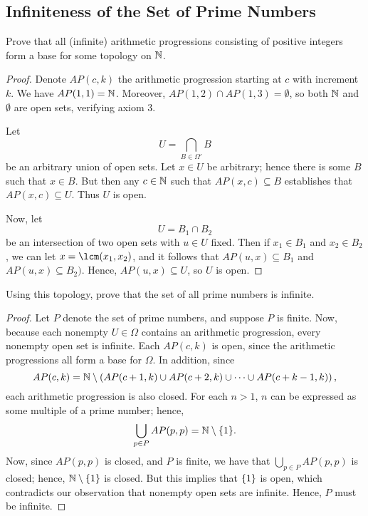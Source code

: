 \subsection{Infiniteness of the Set of Prime Numbers}

\begin{minorEx}
    Prove that all (infinite) arithmetic progressions consisting of positive
    integers form a base for some topology on $\mathbb{N}$.
\end{minorEx}

\begin{proof}
    Denote $AP(c,k)$ the arithmetic progression starting at $c$ with increment
    $k$. We have $AP(1,1) = \mathbb{N}$. Moreover, $AP(1,2) \cap AP(1,3) = \emptyset$,
    so both $\mathbb{N}$ and $\emptyset$ are open sets, verifying axiom 3.

    Let 
    \[
        U = \bigcap_{B \in \Omega'} B
    \]
    be an arbitrary union of open sets. Let $x \in U$ be arbitrary; hence there
    is some $B$ such that $x \in B$. But then any $c \in \mathbb{N}$ such that $AP(x,
    c) \subseteq B$ establishes that $AP(x, c) \subseteq U$. Thus $U$ is open.

    Now, let
    \[
        U = B_1 \cap B_2
    \]
    be an intersection of two open sets with $u \in U$ fixed. Then if $x_1 \in
    B_1$ and $x_2 \in B_2$, we can let $x = \lcm(x_1, x_2)$, and it follows that
    $AP(u,x) \subseteq B_1$ and $AP(u,x) \subseteq B_2)$. Hence, $AP(u, x)
    \subseteq U$, so $U$ is open.
\end{proof}

\begin{minorEx}
    Using this topology, prove that the set of all prime numbers is infinite.
\end{minorEx}

\begin{proof}
    Let $P$ denote the set of prime numbers, and suppose $P$ is finite. Now,
    because each nonempty $U \in \Omega$ contains an arithmetic progression,
    every nonempty open set is infinite. Each $AP(c,k)$ is open, since the
    arithmetic progressions all form a base for $\Omega$. In addition, since
    \[
        AP(c, k) = \mathbb{N} \setminus \left( AP(c+1,k) \cup AP(c+2, k) \cup \cdots
        \cup AP(c+k-1, k) \right),
    \]
    each arithmetic progression is also closed. For each $n > 1$, $n$ can be
    expressed as some multiple of a prime number; hence,
    \[
        \bigcup_{p \in P} AP(p,p) = \mathbb{N} \setminus \{1\}.
    \]
    Now, since $AP(p,p)$ is closed, and $P$ is finite, we have that $\bigcup_{p
    \in P} AP(p,p)$ is closed; hence, $\mathbb{N}\setminus\{1\}$ is closed. But this
    implies that $\{1\}$ is open, which contradicts our observation that
    nonempty open sets are infinite. Hence, $P$ must be infinite.
\end{proof}

